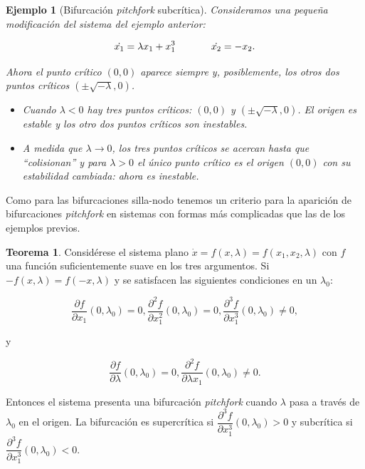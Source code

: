\documentclass[11pt]{book}
\theoremstyle{definition}
\numberwithin{definition}{section}
\theoremstyle{theorem}
\newtheorem{theorem}{Teorema}
\numberwithin{theorem}{section}
\numberwithin{lemma}{section}
\numberwithin{corollary}{section}
\theoremstyle{plain}
\newtheorem{example}{Ejemplo}
\numberwithin{example}{section}
\begin{document}
\begin{example}[Bifurcación \textit{pitchfork} subcrítica]
Consideramos una pequeña modificación del sistema del ejemplo anterior:

$$ 
	\dot{x_1} = \lambda x_1 + x_1^3 \hspace{0.5in} \dot{x_2} = -x_2.
$$

Ahora el punto crítico $(0,0)$ aparece siempre y, posiblemente, los otros dos puntos críticos $(\pm \sqrt{-\lambda}, 0)$.

\begin{itemize}
	\item Cuando $\lambda < 0$ hay tres puntos críticos: $(0,0)$ y $(\pm \sqrt{-\lambda}, 0)$. El origen es estable y los otro dos puntos críticos son inestables.
	\item A medida que $\lambda \to 0$, los tres puntos críticos se acercan hasta que ``colisionan'' y para $\lambda > 0$ el único punto crítico es el origen $(0,0)$ con su estabilidad cambiada: ahora es inestable.
\end{itemize}


\end{example}

Como para las bifurcaciones silla-nodo tenemos un criterio para la aparición de bifurcaciones \textit{pitchfork} en sistemas con formas más complicadas que las de los ejemplos previos.

\begin{theorem}
Considérese el sistema plano $\dot{x} = f(x, \lambda) = f(x_1, x_2, \lambda)$ con $f$ una función suficientemente suave en los tres argumentos. Si $-f(x, \lambda) = f(-x, \lambda)$ y se satisfacen las siguientes condiciones en un $\lambda_0$:

$$
	\dfrac{\partial f}{\partial x_1}(0, \lambda_0) = 0, \dfrac{\partial^2 f}{\partial x_1^2}(0, \lambda_0) = 0, 
	\dfrac{\partial^3 f}{\partial x_1^3}(0, \lambda_0) \neq 0, 
$$

y

$$
	\dfrac{\partial f}{\partial \lambda}(0, \lambda_0) = 0, \dfrac{\partial^2 f}{\partial \lambda x_1}(0, \lambda_0) \neq 0.
$$

Entonces el sistema presenta una bifurcación \textit{pitchfork} cuando $\lambda$ pasa a través de $\lambda_0$ en el origen.
La bifurcación es supercrítica si $\dfrac{\partial^3 f}{\partial x_1^3}(0,\lambda_0) > 0$ y subcrítica si $\dfrac{\partial^3 f}{\partial x_1^3}(0,\lambda_0) < 0$.
\end{theorem}
\end{document}
